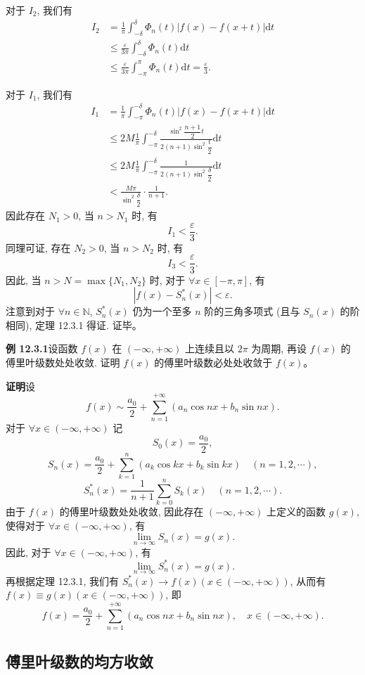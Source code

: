 \documentclass[UTF8, 12pt, fontset=fandol, oneside]{ctexart}
\begin{document}
对于 $I_2$, 我们有
\[
\begin{aligned}
  I_2
  &=\frac1\pi\int_{-\delta}^{\delta}\Phi_n(t)|f(x)-f(x+t)|\mathrm dt\\
  &\leqslant\frac{\varepsilon}{3\pi}\int_{-\delta}^{\delta}\Phi_n(t)\mathrm dt\\
  &\leqslant\frac{\varepsilon}{3\pi}\int_{-\pi}^{\pi}\Phi_n(t)\mathrm dt
  =\frac{\varepsilon}{3}.
\end{aligned}
\]

对于 $I_1$, 我们有
\[
\begin{aligned}
  I_1
  &=\frac1\pi\int_{-\pi}^{-\delta}\Phi_n(t)|f(x)-f(x+t)|\mathrm dt\\
  &\leqslant 2M\frac1\pi\int_{-\pi}^{-\delta}
  \frac{\sin^2\dfrac{n+1}{2}t}{2(n+1)\sin^2\dfrac t2}\mathrm dt\\
  &\leqslant 2M\frac1\pi\int_{-\pi}^{-\delta}
  \frac{1}{2(n+1)\sin^2\dfrac\delta2}\mathrm dt\\
  &<\frac{M\pi}{\sin^2\dfrac\delta2}\cdot\frac1{n+1}.
\end{aligned}
\]
因此存在 $N_1>0$, 当 $n>N_1$ 时, 有
\[
  I_1<\frac{\varepsilon}{3}.
\]
同理可证, 存在 $N_2>0$, 当 $n>N_2$ 时, 有
\[
  I_3<\frac{\varepsilon}{3}.
\]
因此, 当 $n>N=\max\{N_1,N_2\}$ 时, 对于 $\forall x\in[-\pi,\pi]$, 有
\[
  |f(x)-S_n^*(x)|<\varepsilon.
\]
注意到对于 $\forall n\in\mathbb N$, $S_n^*(x)$ 仍为一个至多 $n$ 阶的三角多项式 (且与 $S_n(x)$ 的阶相同), 定理 12.3.1 得证. 证毕。

\noindent\textbf{例 12.3.1}\quad 设函数 $f(x)$ 在 $(-\infty,+\infty)$ 上连续且以 $2\pi$ 为周期, 再设 $f(x)$ 的傅里叶级数处处收敛. 证明 $f(x)$ 的傅里叶级数必处处收敛于 $f(x)$。

\noindent\textbf{证明}\quad 设
\[
  f(x)\sim\frac{a_0}{2}+\sum_{n=1}^{+\infty}(a_n\cos nx+b_n\sin nx).
\]
对于 $\forall x\in(-\infty,+\infty)$ 记
\[
  S_0(x)=\frac{a_0}{2},
\]
\[
  S_n(x)=\frac{a_0}{2}+\sum_{k=1}^n(a_k\cos kx+b_k\sin kx)\quad(n=1,2,\cdots),
\]
\[
  S_n^*(x)=\frac1{n+1}\sum_{k=0}^nS_k(x)\quad(n=1,2,\cdots).
\]
由于 $f(x)$ 的傅里叶级数处处收敛, 因此存在 $(-\infty,+\infty)$ 上定义的函数 $g(x)$, 使得对于 $\forall x\in(-\infty,+\infty)$, 有
\[
  \lim_{n\to\infty}S_n(x)=g(x).
\]
因此, 对于 $\forall x\in(-\infty,+\infty)$, 有
\[
  \lim_{n\to\infty}S_n^*(x)=g(x).
\]
再根据定理 12.3.1, 我们有 $S_n^*(x)\to f(x)(x\in(-\infty,+\infty))$, 从而有 $f(x)\equiv g(x)(x\in(-\infty,+\infty))$, 即
\[
  f(x)=\frac{a_0}{2}+\sum_{n=1}^{+\infty}(a_n\cos nx+b_n\sin nx),\quad x\in(-\infty,+\infty).
\]

\subsection{傅里叶级数的均方收敛}
\end{document}
